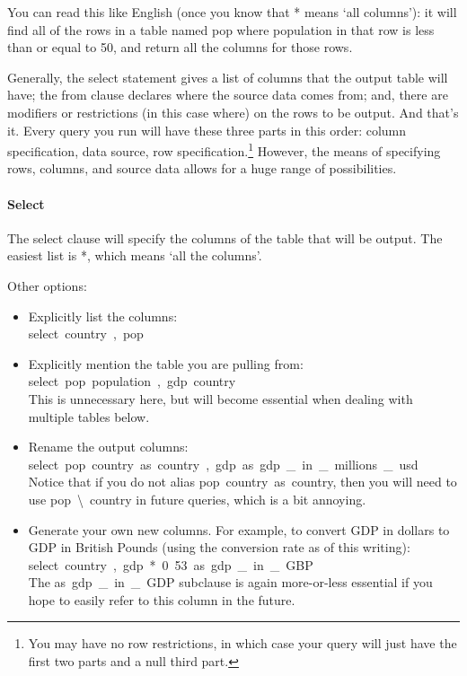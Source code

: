 You can read this like English (once you know that \si{*} means `all
columns'): it will find all of the rows in a table named \si{pop}
where \si{population} in that row is less than or equal to 50, and
return all the columns for those rows.

Generally, the \si{select} statement gives a list of columns that
the output table will have; the \si{from} clause declares where the
source data comes from; and, there are modifiers or restrictions
(in this case \si{where}) on the rows to be output.  And that's
it. Every query you run will have these three parts in this order: column
specification, data source, row specification.\footnote{You may have no
row restrictions, in which case your query will just have the first two
parts and a null third part.} However, the means of specifying rows,
columns, and source data allows for a huge range of possibilities.

\paragraph{Select} 
The \si{select} clause will specify the columns of the table that will
be output. The easiest list is \si{*}, which means `all the columns'.

Other options:\begin{itemize}
\item Explicitly list the columns:\\ \si{select country, pop}
\item Explicitly mention the table you are pulling from:\\
\si{select pop.population, gdp.country}\\
This is unnecessary here, but will become
essential when dealing with multiple tables below.
\item Rename the output columns:\\
\si{select pop.country as country, gdp as gdp\_in\_millions\_usd}\\ 
Notice that if you do not alias \si{pop.country as country}, then
you will need to use \si{pop\textbackslash.country} in future
queries, which is a bit annoying.  
\item Generate your own new columns. For example, to convert GDP in
dollars to GDP in British Pounds (using the conversion rate as of this
writing):\\
\si{select country, gdp*0.53 as gdp\_in\_GBP}\\
The \si{as gdp\_in\_GDP} subclause is again more-or-less
essential if you hope to easily refer to this column in the future. 
\end{itemize}

